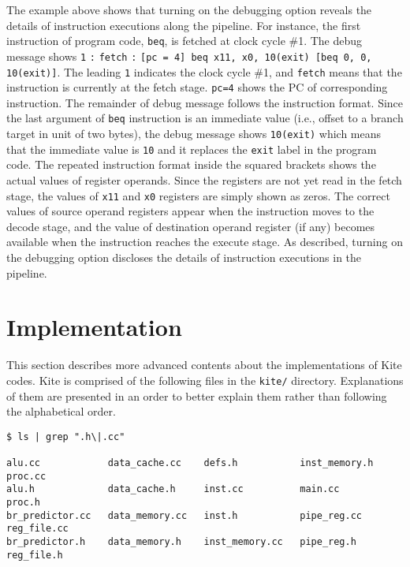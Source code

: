 \documentclass[10pt]{article}
\begin{document}
The example above shows that turning on the debugging option reveals the details of instruction executions along the pipeline.
For instance, the first instruction of program code, {\tt beq}, is fetched at clock cycle \#1.
The debug message shows {\tt 1} {\tt :} {\tt fetch} {\tt :} {\tt[pc = 4] beq x11, x0, 10(exit) [beq 0, 0, 10(exit)]}.
The leading {\tt 1} indicates the clock cycle \#1, and {\tt fetch} means that the instruction is currently at the fetch stage.
{\tt pc=4} shows the PC of corresponding instruction.
The remainder of debug message follows the instruction format.
Since the last argument of {\tt beq} instruction is an immediate value (i.e., offset to a branch target in unit of two bytes), the debug message shows {\tt 10(exit)} which means that the immediate value is {\tt 10} and it replaces the {\tt exit} label in the program code.
The repeated instruction format inside the squared brackets shows the actual values of register operands.
Since the registers are not yet read in the fetch stage, the values of {\tt x11} and {\tt x0} registers are simply shown as zeros.
The correct values of source operand registers appear when the instruction moves to the decode stage, and the value of destination operand register (if any) becomes available when the instruction reaches the execute stage.
As described, turning on the debugging option discloses the details of instruction executions in the pipeline.


\section{Implementation} \label{sec:implementation}
This section describes more advanced contents about the implementations of Kite codes.
Kite is comprised of the following files in the {\tt kite/} directory.
Explanations of them are presented in an order to better explain them rather than following the alphabetical order.

\begin{Verbatim}[frame=single,fontsize=\small]
$ ls | grep ".h\|.cc"

alu.cc            data_cache.cc    defs.h           inst_memory.h   proc.cc
alu.h             data_cache.h     inst.cc          main.cc         proc.h
br_predictor.cc   data_memory.cc   inst.h           pipe_reg.cc     reg_file.cc
br_predictor.h    data_memory.h    inst_memory.cc   pipe_reg.h      reg_file.h
\end{Verbatim}
\end{document}
